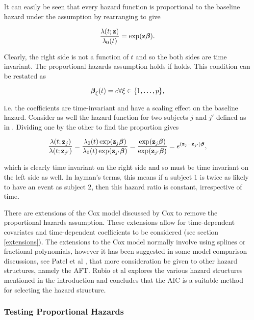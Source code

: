 It can easily be seen that every hazard function is proportional to the baseline hazard under the assumption by rearranging  to give

\begin{equation}\label{prop-hazard}
    \frac{\lambda(t;\textbf{z})}{\lambda_0(t)}=\exp(\textbf{z}\boldsymbol{\beta}).
\end{equation}

Clearly, the right side is not a function of $t$ and so the both sides are time invariant. The proportional hazards assumption holds if  holds. This condition can be restated as

\begin{equation}
    \boldsymbol{\beta}_\xi(t) = c\space \forall \xi\in\{1,\ldots,p\},
\end{equation}

i.e. the coefficients are time-invariant and have a scaling effect on the baseline hazard. Consider as well the hazard function for two subjects $j$ and $j'$ defined as in . Dividing one by the other to find the proportion gives

\begin{equation}\label{hazard-ratio}
    \frac{\lambda(t;\textbf{z}_j)}{\lambda(t;\textbf{z}_{j'})} =\frac{\lambda_0(t)\exp(\textbf{z}_j\boldsymbol{\beta})}{\lambda_0(t)\exp(\textbf{z}_{j'}\boldsymbol{\beta})}=\frac{\exp(\textbf{z}_j\boldsymbol{\beta})}{\exp(\textbf{z}_{j'}\boldsymbol{\beta})}=e^{(\textbf{z}_j-\textbf{z}_{j'})\boldsymbol{\beta}},
\end{equation}

which is clearly time invariant on the right side and so must be time invariant on the left side as well. In layman's terms, this means if a subject 1 is twice as likely to have an event as subject 2, then this hazard ratio is constant, irrespective of time.

There are extensions of the Cox model discussed by Cox  to remove the proportional hazards assumption. These extensions allow for time-dependent covariates and time-dependent coefficients to be considered (see section \ref{extensions}). The extensions to the Cox model normally involve using splines or fractional polynomials, however it has been suggested in some model comparison discussions, see Patel et al , that more consideration be given to other hazard structures, namely the AFT. Rubio et al  explores the various hazard structures mentioned in the introduction and concludes that the AIC is a suitable method for selecting the hazard structure.

\subsubsection{Testing Proportional Hazards}

